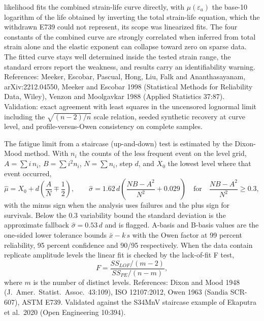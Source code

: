 \documentclass[11pt]{article}
\begin{document}
likelihood fits the combined strain-life curve directly, with
\(\mu(\varepsilon_a)\) the base-10 logarithm of the life obtained by
inverting the total strain-life equation, which the withdrawn E739 could not
represent, its scope was linearized fits. The four constants of the combined
curve are strongly correlated when inferred from total strain alone and the
elastic exponent can collapse toward zero on sparse data. The fitted curve
stays well determined inside the tested strain range, the standard errors
report the weakness, and results carry an identifiability warning.
References: Meeker, Escobar, Pascual, Hong, Liu, Falk and Ananthasayanam,
arXiv:2212.04550, Meeker and Escobar 1998 (Statistical Methods for
Reliability Data, Wiley), Venzon and Moolgavkar 1988 (Applied Statistics
37:87). Validation: exact agreement with least squares in the uncensored
lognormal limit including the \(\sqrt{(n-2)/n}\) scale relation, seeded
synthetic recovery at curve level, and profile-versus-Owen consistency on
complete samples.

The fatigue limit from a staircase (up-and-down) test is estimated by the
Dixon-Mood method. With \(n_i\) the counts of the less frequent event on the
level grid, \(A=\sum i\,n_i\), \(B=\sum i^2 n_i\), \(N=\sum n_i\), step
\(d\), and \(X_0\) the lowest level where that event occurred,
\begin{equation}
\hat\mu = X_0 + d\left(\frac{A}{N} \mp \frac{1}{2}\right),
\qquad
\hat\sigma = 1.62\,d\left(\frac{NB-A^2}{N^2} + 0.029\right)
\quad\text{for}\quad \frac{NB-A^2}{N^2} \ge 0.3,
\end{equation}
with the minus sign when the analysis uses failures and the plus sign for
survivals. Below the 0.3 variability bound the standard deviation is the
approximate fallback \(\hat\sigma = 0.53\,d\) and is flagged. A-basis and
B-basis values are the one-sided lower tolerance bounds \(\bar x - k\,s\)
with the Owen factor at 99 percent reliability, 95 percent confidence and
90/95 respectively. When the data contain replicate amplitude levels the
linear fit is checked by the lack-of-fit F test,
\begin{equation}
F = \frac{SS_{LOF}/(m-2)}{SS_{PE}/(n-m)},
\end{equation}
where \(m\) is the number of distinct levels. References: Dixon and Mood
1948 (J.\ Amer.\ Statist.\ Assoc.\ 43:109), ISO 12107:2012, Owen 1963
(Sandia SCR-607), ASTM E739. Validated against the S34MnV staircase example
of Ekaputra et al.\ 2020 (Open Engineering 10:394).
\end{document}
